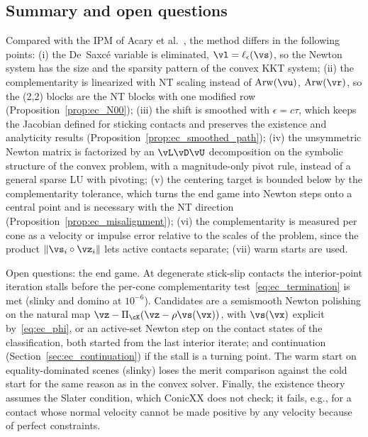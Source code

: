 \subsection{Summary and open questions}\label{sec:ec_summary}
%
Compared with the IPM of Acary et al.~\cite{Acary2026}, the method differs in the following points: (i) the De~Saxc\'e variable is eliminated, $\vl = \ell_\epsilon(\vs)$, so the Newton system has the size and the sparsity pattern of the convex KKT system; (ii) the complementarity is linearized with NT scaling instead of $\operatorname{Arw}(\vu)$, $\operatorname{Arw}(\vr)$, so the (2,2) blocks are the NT blocks with one modified row (Proposition~\ref{prop:ec_N00}); (iii) the shift is smoothed with $\epsilon = c\tau$, which keeps the Jacobian defined for sticking contacts and preserves the existence and analyticity results (Proposition~\ref{prop:ec_smoothed_path}); (iv) the unsymmetric Newton matrix is factorized by an $\vL\vD\vU$ decomposition on the symbolic structure of the convex problem, with a magnitude-only pivot rule, instead of a general sparse LU with pivoting; (v) the centering target is bounded below by the complementarity tolerance, which turns the end game into Newton steps onto a central point and is necessary with the NT direction (Proposition~\ref{prop:ec_misalignment}); (vi) the complementarity is measured per cone as a velocity or impulse error relative to the scales of the problem, since the product $\|\vs_i\circ\vz_i\|$ lets active contacts separate; (vii) warm starts are used.

Open questions: the end game. At degenerate stick-slip contacts the interior-point iteration stalls before the per-cone complementarity test~\eqref{eq:ec_termination} is met (slinky and domino at $10^{-6}$). Candidates are a semismooth Newton polishing on the natural map $\vz - \Pi_\cK(\vz - \rho\vs(\vx))$, with $\vs(\vx)$ explicit by~\eqref{eq:ec_phi}, or an active-set Newton step on the contact states of the classification, both started from the last interior iterate; and continuation (Section~\ref{sec:ec_continuation}) if the stall is a turning point. The warm start on equality-dominated scenes (slinky) loses the merit comparison against the cold start for the same reason as in the convex solver. Finally, the existence theory assumes the Slater condition, which ConicXX does not check; it fails, e.g., for a contact whose normal velocity cannot be made positive by any velocity because of perfect constraints.
